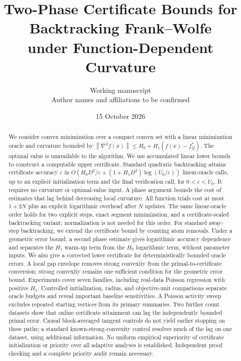 \documentclass[11pt]{article}
\title{Two-Phase Certificate Bounds for Backtracking Frank--Wolfe\\
under Function-Dependent Curvature}
\author{Working manuscript\\Author names and affiliations to be confirmed}
\date{15 October 2026}
\newcommand{\norm}[1]{\left\|#1\right\|}
\begin{document}
\maketitle
\begin{abstract}
We consider convex minimization over a compact convex set with a linear
minimization oracle and curvature bounded by
$\norm{\nabla^2 f(x)}\le H_0+H_1(f(x)-f_Q^*)$.
The optimal value is unavailable to the algorithm. We use accumulated
linear lower bounds to construct a computable upper certificate. Standard
quadratic backtracking attains certificate accuracy $\varepsilon$ in
$O(H_0D^2/\varepsilon+(1+H_1D^2)\log(U_0/\varepsilon))$ linear-oracle calls,
up to an explicit initialization term and the final verification call,
for $0<\varepsilon<U_0$. It requires no curvature or optimal-value input.
A phase argument bounds the cost of estimates that lag behind decreasing
local curvature. All function trials cost at most $1+2N$ plus an explicit
logarithmic overhead after $N$ updates. The same linear-oracle order holds
for two explicit steps, exact segment minimization, and a
certificate-scaled backtracking variant; normalization is not needed
for this order. For standard away-step backtracking, we extend the
certificate bound by counting atom removals. Under a geometric error
bound, a second phase estimate gives logarithmic
accuracy dependence and separates the $H_1$ warm-up term from the
$H_0$ logarithmic term, without parameter inputs. We also give a corrected
lower certificate for deterministically bounded oracle errors.
A local gap envelope removes strong convexity from the primal-to-certificate
conversion; strong convexity remains one sufficient condition for the
geometric error bound.
Experiments cover seven families, including real-data Poisson regression
with positive $H_1$. Controlled initialization, radius, and objective-unit
comparisons separate oracle budgets and reveal important baseline
sensitivities. A Poisson activity sweep excludes repeated starting
vertices from its primary summaries. Two further count datasets show
that online certificate attainment can lag the independently bounded
primal error. Causal block-averaged tangent controls do not yield earlier
stopping on these paths; a standard known-strong-convexity control
resolves much of the lag on one dataset, using additional information.
No uniform empirical superiority
of certificate initialization or priority over all adaptive analyses
is established.
Independent proof checking and a complete priority audit remain necessary.
\end{abstract}
\end{document}
